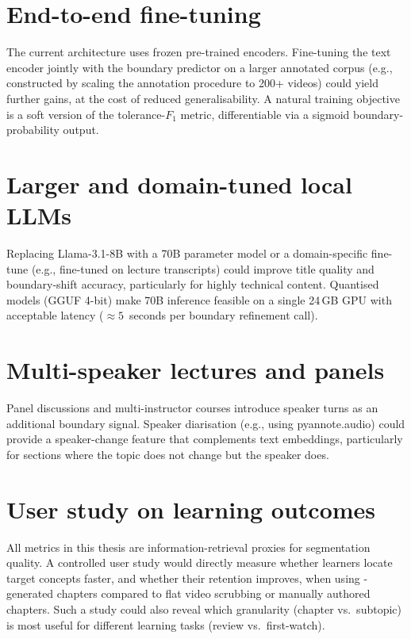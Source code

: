\section{End-to-end fine-tuning}

The current architecture uses frozen pre-trained encoders.
Fine-tuning the text encoder jointly with the boundary predictor on a larger
annotated corpus (e.g., constructed by scaling the \dataset{} annotation
procedure to 200+ videos) could yield further gains, at the cost of reduced
generalisability.
A natural training objective is a soft version of the tolerance-$F_1$ metric,
differentiable via a sigmoid boundary-probability output.

\section{Larger and domain-tuned local LLMs}

Replacing Llama-3.1-8B with a 70B parameter model or a domain-specific
fine-tune (e.g., fine-tuned on lecture transcripts) could improve title
quality and boundary-shift accuracy, particularly for highly technical content.
Quantised models (GGUF 4-bit) make 70B inference feasible on a single 24\,GB
GPU with acceptable latency ($\approx 5$~seconds per boundary refinement call).

\section{Multi-speaker lectures and panels}

Panel discussions and multi-instructor courses introduce speaker turns as an
additional boundary signal.
Speaker diarisation (e.g., using pyannote.audio) could provide a speaker-change
feature that complements text embeddings, particularly for sections where the
topic does not change but the speaker does.

\section{User study on learning outcomes}

All metrics in this thesis are information-retrieval proxies for segmentation
quality.
A controlled user study would directly measure whether learners locate
target concepts faster, and whether their retention improves, when using
\lecseg{}-generated chapters compared to flat video scrubbing or manually
authored chapters.
Such a study could also reveal which granularity (chapter vs.\ subtopic)
is most useful for different learning tasks (review vs.\ first-watch).

